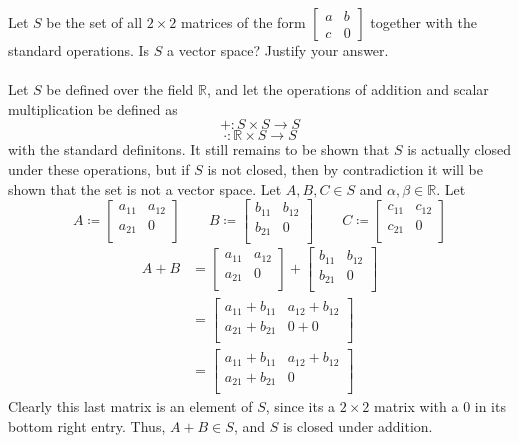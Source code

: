 \documentclass{article}
\begin{document}
\newpage
{} Let $S$ be the set of all $2 \times 2$ matrices of the form $\begin{bmatrix} a&b\\ c&0 \end{bmatrix}$ together with the standard operations.  Is $S$ a vector space?  Justify your answer.\\
\noindent\makebox[\linewidth]{\rule{\linewidth}{0.4pt}}\\
Let \(S\) be defined over the field \(\mathbb{R} \), and let the operations of addition and scalar multiplication be defined as 
\[
  +:S\times S\to S
\]
\[
  \cdot:\mathbb{R} \times S\to S
\]
with the standard definitons. It still remains to be shown that \(S\) is actually closed under these operations, but if \(S\) is not closed, then by contradiction it will be shown that the set is not a vector space. Let \(A,B,C\in S\) and \(\alpha ,\beta \in\mathbb{R} \). Let 
\[
  A\coloneqq \begin{bmatrix}
    a_{11}  &a_{12}    \\
     a_{21} &0    \\
  \end{bmatrix}\qquad B\coloneqq \begin{bmatrix}
    b_{11}  &b_{12}    \\
     b_{21} &0    \\
  \end{bmatrix}\qquad C\coloneqq \begin{bmatrix}
    c_{11}  &c_{12}    \\
     c_{21} &0   \\
  \end{bmatrix}
\]
\begin{align*}
  A+B&=\begin{bmatrix}
    a_{11}  &   a_{12} \\
   a_{21}   & 0  \\
  \end{bmatrix}+\begin{bmatrix}
    b_{11}  &b_{12}    \\
     b_{21} &0    \\
  \end{bmatrix}\\
  &=\begin{bmatrix}
    a_{11}+b_{11}   & a_{12}+b_{12}    \\
     a_{21}+b_{21}  &   0+0\\
  \end{bmatrix}\\
  &=\begin{bmatrix}
    a_{11}+b_{11}   & a_{12}+b_{12}    \\
     a_{21}+b_{21}  &   0\\
  \end{bmatrix}
\end{align*}
Clearly this last matrix is an element of \(S\), since its a \(2\times 2\) matrix with a \(0\) in its bottom right entry. Thus, \(A+B\in S\), and \(S\) is closed under addition.
\end{document}
